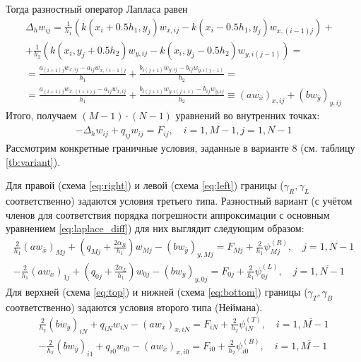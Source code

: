\documentclass[12pt, fleqn]{article}
\theoremstyle{definition}
\begin{document}
Тогда разностный оператор Лапласа равен
\begin{gather}\nonumber 
\Delta_{h} w_{i j}= \frac{1}{h_{1}}\left(k\left(x_{i}+0.5 h_{1}, y_{j}\right) w_{x, ij} - k\left(x_{i}-0.5 h_{1}, y_{j}\right) w_{x, (i-1)j }\right)+ \\ \nonumber 
+\frac{1}{h_{2}}\left(k\left(x_{i}, y_{j}+0.5 h_{2}\right) w_{y, i j} - k\left(x_{i}, y_{j}-0.5 h_{2}\right) w_{y, i (j-1)}\right) = \\
= \frac{a_{(i+1) j} w_{x, ij} - a_{ij} w_{x, (i-1)j }}{h_{1}} + \frac{b_{i (j+1)} w_{y, i j} - b_{ij} w_{y, i (j-1)}}{h_{2}} = \nonumber\\ 
= \frac{a_{(i+1) j} w_{\overline{x}, (i+1)j} - a_{ij} w_{\overline{x}, ij }}{h_{1}} + \frac{b_{i (j+1)} w_{\overline{y}, i (j+1)} - b_{ij} w_{\overline{y}, i j}}{h_{2}} \equiv \left(a w_{\overline{x}}\right)_{x, i j}+\left(b w_{\overline{y}}\right)_{y, i j} \label{eq:laplace_diff}
\end{gather}
Итого, получаем $(M-1)\cdot(N-1)$ уравнений во внутренних точках:
\begin{gather}
 -\Delta_{h} w_{i j}+q_{i j} w_{i j} =F_{i j}, \quad i=\overline{1, M-1}, j=\overline{1, N-1} 
 \label{eq:main_int}
\end{gather}
Рассмотрим конкретные граничные условия, заданные в варианте 8 (см. таблицу \ref{tb:variant}).

Для правой (схема \ref{eq:right})  и левой (схема \ref{eq:left}) границы ($\gamma_R, \gamma_L$ соответственно) задаются условия третьего типа. Разностный вариант (с учётом членов для соответствия порядка погрешности аппроксимации с основным уравнением \ref{eq:laplace_diff}) для них выглядит следующим образом:
\begin{gather}
 \frac{2}{h_{1}}\left(a w_{\overline{x}}\right)_{M j} + \left(q_{M j}+\frac{2 \alpha_{R}}{h_{1}}\right) w_{M j}-\left(b w_{\overline{y}}\right)_{y, M j}=F_{M j}+\frac{2}{h_{1}} \psi^{(R)}_{M j}, \quad j=\overline{1, N-1} \label{eq:right}\\
-\frac{2}{h_{1}}\left(a w_{\overline{x}}\right)_{1 j}+\left(q_{0 j}+\frac{2 \alpha_{L}}{h_{1}}\right) w_{0 j}-\left(b w_{\overline{y}}\right)_{y, 0 j}=F_{0 j}+\frac{2}{h_{1}} \psi^{(L)}_{0 j}, \quad j=\overline{1, N-1}\label{eq:left}
\end{gather}
Для верхней (схема \ref{eq:top})  и нижней (схема \ref{eq:bottom}) границы ($\gamma_T, \gamma_B$ соответственно) задаются условия второго типа (Неймана).
\begin{gather}
\frac{2}{h_{2}}\left(b w_{\overline{y}}\right)_{i N} + q_{i N} w_{i N}-\left(a w_{\overline{x}}\right)_{x, i N}=F_{i N}+\frac{2}{h_{2}} \psi^{(T)}_{i N},\quad  i=\overline{1, M-1}  \label{eq:top}\\
-\frac{2}{h_{2}}\left(b w_{\overline{y}}\right)_{i 1}+q_{i 0} w_{i 0}-\left(a w_{\overline{x}}\right)_{x, i 0}=F_{i 0}+\frac{2}{h_{2}} \psi^{(B)}_{i 0},\quad  i=\overline{1, M-1} \label{eq:bottom}
\end{gather}
\end{document}

